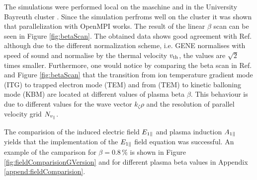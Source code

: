 The simulations were performed local on the maschine  and in the University Bayreuth cluster . Since the simulation perfroms well on the cluster it was shown that parallelization with OpenMPI works. The result of the linear $\beta$ scan can be seen in Figure \ref{fig:betaScan}. The obtained data shows good agreement with Ref.  although due to the different normalization scheme, i.e. GENE normalises with speed of sound and \gkw normalise by the thermal velocity $v_\mathrm{th}$, the values are $\sqrt{2}$ times smaller. Furthermore, one would notice by comparing the beta scan in Ref.  and Figure \ref{fig:betaScan} that the transition from ion temperature gradient mode (ITG) to trapped electron mode (TEM) and from (TEM) to kinetic balloning mode (KBM) are located at different values of plasma beta $\beta$. This behaviour is due to different values for the wave vector $k_\zeta \rho$ and the resolution of parallel velocity grid $N_{v_\parallel}$. %


The comparision of the induced electric field $E_{1\parallel}$ and plasma induction $A_{1\parallel}$ yields that the implementation of the $E_{1\parallel}$ field equation was successful. An example of the camparison for $\beta = 0.8\,\%$ is shown in Figure \ref{fig:fieldComparisionGVersion} and for different plasma beta values in Appendix \ref{append:fieldComparision}. 



% 


\newpage